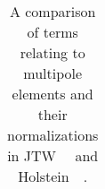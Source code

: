 \begin{table}[h!!!!t]
\begin{center}
\begin{tabular}{ | l | l | l | p{2.35in} | }
		\\  \hline
	\end{tabular}
	\end{center}
	\caption[Multipole Notation]{A comparison of terms relating to multipole elements and their normalizations in JTW~\cite{jtw}~\cite{jtw_coulomb} and Holstein~\cite{holstein}~\cite{holstein_errata}.}
	\label{table:compare_notation_multipoles}
\end{table}
\renewcommand{\arraystretch}{1}
%
%
%
%
